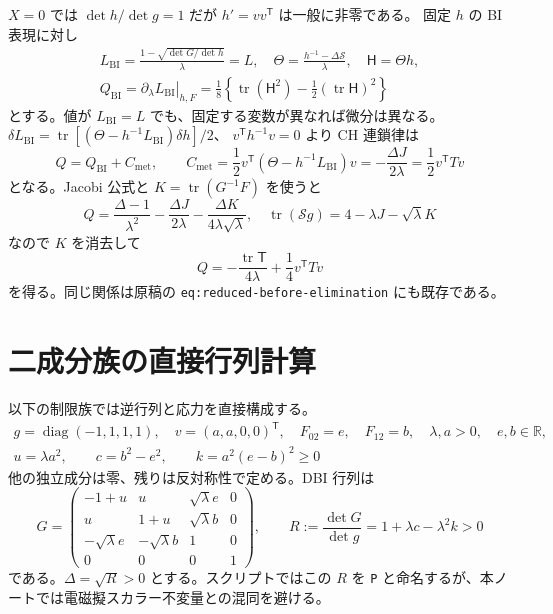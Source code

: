 \documentclass[11pt,a4paper]{article}
\newcommand{\tr}{\operatorname{tr}}
\newcommand{\Tmix}{\mathsf{T}}
\newcommand{\Thmix}{\mathsf{H}}
\newcommand{\Sinv}{\mathcal S}
\newcommand{\Qbi}{Q_{\mathrm{BI}}}
\newcommand{\Cmet}{C_{\mathrm{met}}}
\newcommand{\Lbi}{L_{\mathrm{BI}}}
\begin{document}
$X=0$ では $\det h/\det g=1$ だが $h'=vv^{\mathsf T}$ は一般に非零である。
固定 $h$ の BI 表現に対し
\begin{equation}\label{eq:CH}
\begin{gathered}
\Lbi=\frac{1-\sqrt{\det G/\det h}}\lambda=L,\quad
\Theta=\frac{h^{-1}-\Delta\Sinv}{\lambda},\quad \Thmix=\Theta h,\\
\Qbi=\left.\partial_\lambda\Lbi\right|_{h,F}
=\frac18\left\{\tr(\Thmix^2)-\frac12(\tr\Thmix)^2\right\}
\end{gathered}
\end{equation}
とする。値が $\Lbi=L$ でも、固定する変数が異なれば微分は異なる。
$\delta\Lbi=\tr[(\Theta-h^{-1}\Lbi)\delta h]/2$、
$v^{\mathsf T}h^{-1}v=0$ より CH 連鎖律は
\begin{equation}\label{eq:chain}
Q=\Qbi+\Cmet,\qquad
\Cmet=\frac12v^{\mathsf T}(\Theta-h^{-1}\Lbi)v
=-\frac{\Delta J}{2\lambda}=\frac12v^{\mathsf T}Tv
\end{equation}
となる。Jacobi 公式と $K=\tr(G^{-1}F)$ を使うと
\begin{equation}\label{eq:trace-step}
Q=\frac{\Delta-1}{\lambda^2}-\frac{\Delta J}{2\lambda}
 -\frac{\Delta K}{4\lambda\sqrt\lambda},\quad
\tr(\Sinv g)=4-\lambda J-\sqrt\lambda K
\end{equation}
なので $K$ を消去して
\begin{equation}\label{eq:trace-directional}
\boxed{Q=-\frac{\tr\Tmix}{4\lambda}+\frac14v^{\mathsf T}Tv}
\end{equation}
を得る。同じ関係は原稿の \texttt{eq:reduced-before-elimination} にも既存である。

\newpage
\section{二成分族の直接行列計算}
以下の制限族では逆行列と応力を直接構成する。
\begin{equation}\label{eq:twofield}
\begin{gathered}
g=\operatorname{diag}(-1,1,1,1),\quad v=(a,a,0,0)^{\mathsf T},\quad
F_{02}=e,\quad F_{12}=b,\quad \lambda,a>0,\quad e,b\in\mathbb R,\\
u=\lambda a^2,\qquad c=b^2-e^2,\qquad k=a^2(e-b)^2\geq0
\end{gathered}
\end{equation}
他の独立成分は零、残りは反対称性で定める。DBI 行列は
\begin{equation}\label{eq:G-twofield}
G=\begin{pmatrix}
-1+u&u&\sqrt\lambda e&0\\
u&1+u&\sqrt\lambda b&0\\
-\sqrt\lambda e&-\sqrt\lambda b&1&0\\
0&0&0&1
\end{pmatrix},\qquad
R:=\frac{\det G}{\det g}=1+\lambda c-\lambda^2k>0
\end{equation}
である。$\Delta=\sqrt R>0$ とする。スクリプトではこの $R$ を
\texttt{P} と命名するが、本ノートでは電磁擬スカラー不変量との混同を避ける。
\end{document}
